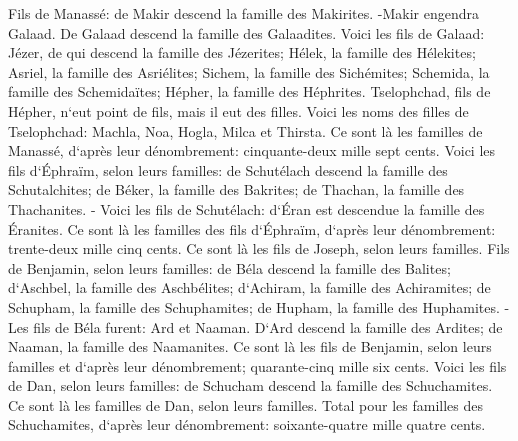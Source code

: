 \verse Fils de Manassé: de Makir descend la famille des Makirites. -Makir engendra Galaad. De Galaad descend la famille des Galaadites. 
\verse Voici les fils de Galaad: Jézer, de qui descend la famille des Jézerites; Hélek, la famille des Hélekites; 
\verse Asriel, la famille des Asriélites; Sichem, la famille des Sichémites; 
\verse Schemida, la famille des Schemidaïtes; Hépher, la famille des Héphrites. 
\verse Tselophchad, fils de Hépher, n`eut point de fils, mais il eut des filles. Voici les noms des filles de Tselophchad: Machla, Noa, Hogla, Milca et Thirsta. 
\verse Ce sont là les familles de Manassé, d`après leur dénombrement: cinquante-deux mille sept cents. 
\verse Voici les fils d`Éphraïm, selon leurs familles: de Schutélach descend la famille des Schutalchites; de Béker, la famille des Bakrites; de Thachan, la famille des Thachanites. - 
\verse Voici les fils de Schutélach: d`Éran est descendue la famille des Éranites. 
\verse Ce sont là les familles des fils d`Éphraïm, d`après leur dénombrement: trente-deux mille cinq cents. Ce sont là les fils de Joseph, selon leurs familles. 
\verse Fils de Benjamin, selon leurs familles: de Béla descend la famille des Balites; d`Aschbel, la famille des Aschbélites; d`Achiram, la famille des Achiramites; 
\verse de Schupham, la famille des Schuphamites; de Hupham, la famille des Huphamites. - 
\verse Les fils de Béla furent: Ard et Naaman. D`Ard descend la famille des Ardites; de Naaman, la famille des Naamanites. 
\verse Ce sont là les fils de Benjamin, selon leurs familles et d`après leur dénombrement; quarante-cinq mille six cents. 
\verse Voici les fils de Dan, selon leurs familles: de Schucham descend la famille des Schuchamites. Ce sont là les familles de Dan, selon leurs familles. 
\verse Total pour les familles des Schuchamites, d`après leur dénombrement: soixante-quatre mille quatre cents. 

